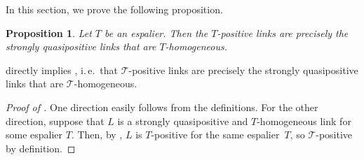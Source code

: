\documentclass{amsart}
\theoremstyle{definition}
\theoremstyle{remark}
\theoremstyle{plain}
\newtheorem{proposition}[definition]{Proposition}
\newcommand{\ie}{i.\,e.~}
\newcommand{\T}{\mathcal{T}}
\begin{document}
In this section, we prove the following proposition.

\begin{proposition}\label{prop:main_T-pos}
Let $T$ be an espalier. Then the $T$-positive links are precisely the strongly quasipositive links that are $T$-homogeneous.
\end{proposition}

 directly implies , \ie that $\T$-positive links are precisely the strongly quasipositive links that are $\T$-homogeneous.

\begin{proof}[{Proof of }]
One direction easily follows from the definitions. For the other direction, suppose that $L$ is a strongly quasipositive and $T$-homogeneous link for some espalier $T$. Then, by , $L$ is $T$-positive for the same espalier~$T$, so $\T$-positive by definition.
\end{proof}
\end{document}
